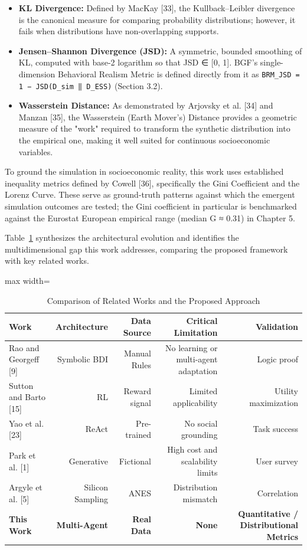 \begin{itemize}
\item \textbf{KL Divergence:} Defined by MacKay [33], the Kullback–Leibler divergence is the canonical measure for comparing probability distributions; however, it fails when distributions have non-overlapping supports.
\item \textbf{Jensen–Shannon Divergence (JSD):} A symmetric, bounded smoothing of KL, computed with base-2 logarithm so that JSD ∈ [0, 1]. BGF's single-dimension Behavioral Realism Metric is defined directly from it as \texttt{BRM\_JSD = 1 − JSD(D\_sim ‖ D\_ESS)} (Section 3.2).
\item \textbf{Wasserstein Distance:} As demonstrated by Arjovsky et al. [34] and Manzan [35], the Wasserstein (Earth Mover's) Distance provides a geometric measure of the "work" required to transform the synthetic distribution into the empirical one, making it well suited for continuous socioeconomic variables.
\end{itemize}


To ground the simulation in socioeconomic reality, this work uses established inequality metrics defined by Cowell [36], specifically the Gini Coefficient and the Lorenz Curve. These serve as ground-truth patterns against which the emergent simulation outcomes are tested; the Gini coefficient in particular is benchmarked against the Eurostat European empirical range (median G ≈ 0.31) in Chapter 5.


Table~\ref{tab:1} synthesizes the architectural evolution and identifies the multidimensional gap this work addresses, comparing the proposed framework with key related works.


\begin{table}[H]
\centering
\caption{Comparison of Related Works and the Proposed Approach}
\label{tab:1}
\footnotesize
\begin{adjustbox}{max width=\textwidth}
\begin{tabular}{lrrrr}
\toprule
Work & Architecture & Data Source & Critical Limitation & Validation \\
\midrule
Rao and Georgeff [9] & Symbolic BDI & Manual Rules & No learning or multi-agent adaptation & Logic proof \\
Sutton and Barto [15] & RL & Reward signal & Limited applicability & Utility maximization \\
Yao et al. [23] & ReAct & Pre-trained & No social grounding & Task success \\
Park et al. [1] & Generative & Fictional & High cost and scalability limits & User survey \\
Argyle et al. [5] & Silicon Sampling & ANES & Distribution mismatch & Correlation \\
\textbf{This Work} & \textbf{Multi-Agent} & \textbf{Real Data} & \textbf{None} & \textbf{Quantitative / Distributional Metrics} \\
\bottomrule
\end{tabular}
\end{adjustbox}
\end{table}

